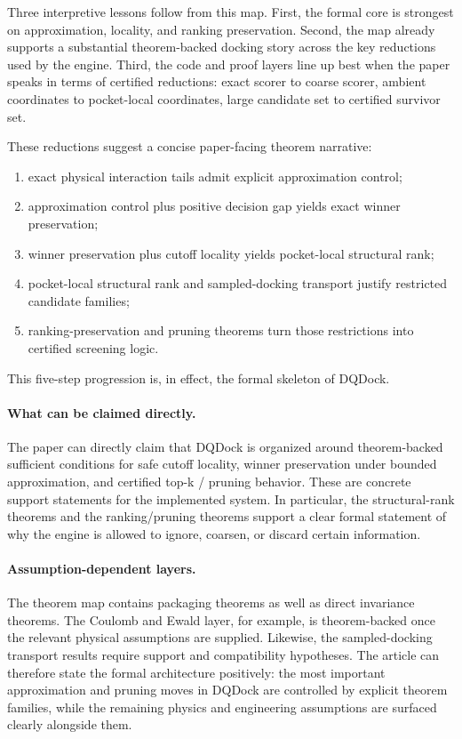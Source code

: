 Three interpretive lessons follow from this map. First, the formal core is strongest on approximation, locality, and ranking preservation. Second, the map already supports a substantial theorem-backed docking story across the key reductions used by the engine. Third, the code and proof layers line up best when the paper speaks in terms of certified reductions: exact scorer to coarse scorer, ambient coordinates to pocket-local coordinates, large candidate set to certified survivor set.

These reductions suggest a concise paper-facing theorem narrative:
\begin{enumerate}
\item exact physical interaction tails admit explicit approximation control;
\item approximation control plus positive decision gap yields exact winner preservation;
\item winner preservation plus cutoff locality yields pocket-local structural rank;
\item pocket-local structural rank and sampled-docking transport justify restricted candidate families;
\item ranking-preservation and pruning theorems turn those restrictions into certified screening logic.
\end{enumerate}
This five-step progression is, in effect, the formal skeleton of DQDock.

\paragraph{What can be claimed directly.}
The paper can directly claim that DQDock is organized around theorem-backed sufficient conditions for safe cutoff locality, winner preservation under bounded approximation, and certified top-k / pruning behavior. These are concrete support statements for the implemented system. In particular, the structural-rank theorems  and the ranking/pruning theorems  support a clear formal statement of why the engine is allowed to ignore, coarsen, or discard certain information.

\paragraph{Assumption-dependent layers.}
The theorem map contains packaging theorems as well as direct invariance theorems. The Coulomb and Ewald layer, for example, is theorem-backed once the relevant physical assumptions are supplied. Likewise, the sampled-docking transport results require support and compatibility hypotheses. The article can therefore state the formal architecture positively: the most important approximation and pruning moves in DQDock are controlled by explicit theorem families, while the remaining physics and engineering assumptions are surfaced clearly alongside them.

